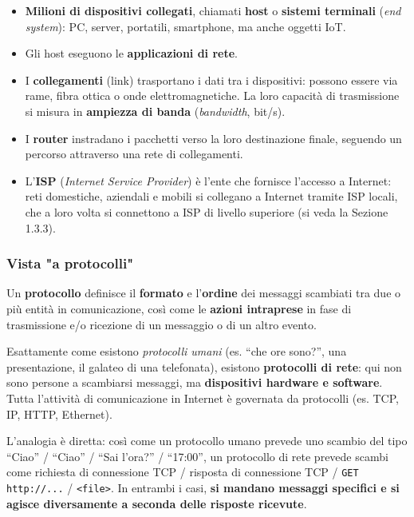 \documentclass[12pt, a4paper]{article}
\begin{document}
\begin{itemize}
    \item \textbf{Milioni di dispositivi collegati}, chiamati \textbf{host} o \textbf{sistemi terminali} (\textit{end system}): PC, server, portatili, smartphone, ma anche oggetti IoT.
    \item Gli host eseguono le \textbf{applicazioni di rete}.
    \item I \textbf{collegamenti} (link) trasportano i dati tra i dispositivi: possono essere via rame, fibra ottica o onde elettromagnetiche. La loro capacità di trasmissione si misura in \textbf{ampiezza di banda} (\textit{bandwidth}, bit/s).
    \item I \textbf{router} instradano i pacchetti verso la loro destinazione finale, seguendo un percorso attraverso una rete di collegamenti.
    \item L'\textbf{ISP} (\textit{Internet Service Provider}) è l'ente che fornisce l'accesso a Internet: reti domestiche, aziendali e mobili si collegano a Internet tramite ISP locali, che a loro volta si connettono a ISP di livello superiore (si veda la Sezione 1.3.3).
\end{itemize}

\subsubsection{Vista "a protocolli"}

\begin{tcolorbox}[colback=lightergray!10, colframe=tocsec, title=\textbf{Definizione: protocollo}]
Un \textbf{protocollo} definisce il \textbf{formato} e l'\textbf{ordine} dei messaggi scambiati tra due o più entità in comunicazione, così come le \textbf{azioni intraprese} in fase di trasmissione e/o ricezione di un messaggio o di un altro evento.
\end{tcolorbox}

Esattamente come esistono \textit{protocolli umani} (es. ``che ore sono?'', una presentazione, il galateo di una telefonata), esistono \textbf{protocolli di rete}: qui non sono persone a scambiarsi messaggi, ma \textbf{dispositivi hardware e software}. Tutta l'attività di comunicazione in Internet è governata da protocolli (es. TCP, IP, HTTP, Ethernet).

L'analogia è diretta: così come un protocollo umano prevede uno scambio del tipo ``Ciao'' / ``Ciao'' / ``Sai l'ora?'' / ``17:00'', un protocollo di rete prevede scambi come richiesta di connessione TCP / risposta di connessione TCP / \texttt{GET http://...} / \texttt{<file>}. In entrambi i casi, \textbf{si mandano messaggi specifici e si agisce diversamente a seconda delle risposte ricevute}.
\end{document}

